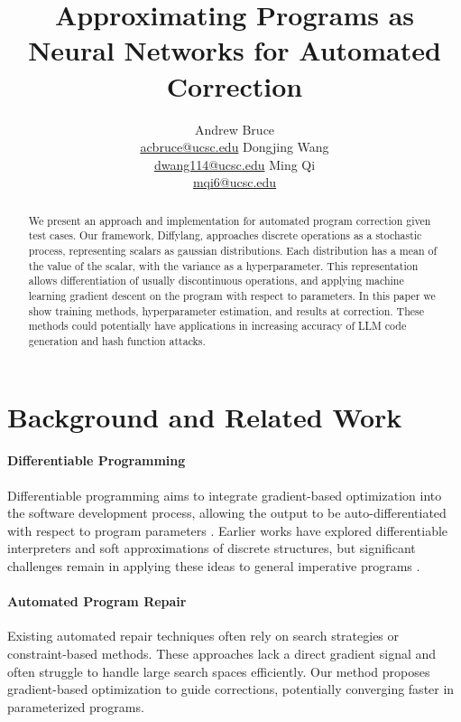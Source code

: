 \documentclass{article}
\title{Approximating Programs as Neural Networks for Automated Correction}
\author{
  Andrew Bruce \\ \href{mailto:acbruce@ucsc.edu}{acbruce@ucsc.edu}
  \And
  Dongjing Wang \\ \href{mailto:dwang114@ucsc.edu}{dwang114@ucsc.edu}
  \And
  Ming Qi \\ \href{mailto:mqi6@ucsc.edu}{mqi6@ucsc.edu}
}
\begin{document}
\maketitle

\begin{abstract}
  We present an approach and implementation for automated program correction given test cases. Our framework, Diffylang, approaches discrete operations as a stochastic process, representing scalars as gaussian distributions. Each distribution has a mean of the value of the scalar, with the variance as a hyperparameter. This representation allows differentiation of usually discontinuous operations, and applying machine learning gradient descent on the program with respect to parameters. In this paper we show training methods, hyperparameter estimation, and results at correction. These methods could potentially have applications in increasing accuracy of LLM code generation and hash function attacks.
\end{abstract}

\section{Background and Related Work}
\paragraph{Differentiable Programming} Differentiable programming aims to integrate gradient-based optimization into the software development process, allowing the output to be auto-differentiated with respect to program parameters \cite{blondel2024elementsdifferentiableprogramming,DBLP:journals/corr/abs-1907-07587,vandemeulebroucke2018myia}. Earlier works have explored differentiable interpreters and soft approximations of discrete structures, but significant challenges remain in applying these ideas to general imperative programs \cite{Considine_Kotlin_A_Shape-Safe_2019}.

\paragraph{Automated Program Repair} Existing automated repair techniques often rely on search strategies or constraint-based methods. These approaches lack a direct gradient signal and often struggle to handle large search spaces efficiently. Our method proposes gradient-based optimization to guide corrections, potentially converging faster in parameterized programs.
\end{document}
